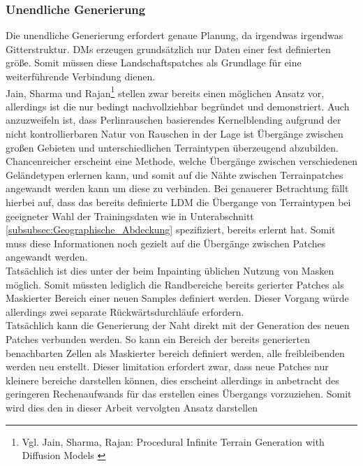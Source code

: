 \subsubsection {Unendliche Generierung}

Die unendliche Generierung erfordert genaue Planung, da irgendwas irgendwas Gitterstruktur. DMs erzeugen grundsätzlich nur Daten einer fest definierten größe. Somit müssen diese Landschaftspatches als Grundlage für eine weiterführende Verbindung dienen.\\
Jain, Sharma und Rajan\footnote{
    Vgl. Jain, Sharma, Rajan: Procedural Infinite Terrain Generation with Diffusion Models
    \cite{jain2022adaptive}
} stellen zwar bereits einen möglichen Ansatz vor, allerdings ist die nur bedingt nachvollziehbar begründet und demonstriert. Auch anzuzweifeln ist, dass Perlinrauschen basierendes Kernelblending aufgrund der nicht kontrollierbaren Natur von Rauschen in der Lage ist Übergänge zwischen großen Gebieten und unterschiedlichen Terraintypen überzeugend abzubilden. \\
Chancenreicher erscheint eine Methode, welche Übergänge zwischen verschiedenen Geländetypen erlernen kann, und somit auf die Nähte zwischen Terrainpatches angewandt werden kann um diese zu verbinden. Bei genauerer Betrachtung fällt hierbei auf, dass das bereits definierte LDM die Übergange von Terraintypen bei geeigneter Wahl der Trainingsdaten wie in Unterabschnitt \ref{subsubsec:Geographische_Abdeckung} spezifiziert, bereits erlernt hat. Somit muss diese Informationen noch gezielt auf die Übergänge zwischen Patches angewandt werden. \\
Tatsächlich ist dies unter der beim Inpainting üblichen Nutzung von Masken möglich. Somit müssten lediglich die Randbereiche bereits gerierter Patches als Maskierter Bereich einer neuen Samples definiert werden. Dieser Vorgang würde allerdings zwei separate Rückwärtsdurchläufe erfordern. \\
Tatsächlich kann die Generierung der Naht direkt mit der Generation des neuen Patches verbunden werden. So kann ein Bereich der bereits generierten benachbarten Zellen als Maskierter bereich definiert werden, alle freibleibenden werden neu erstellt. Dieser limitation erfordert zwar, dass neue Patches nur kleinere bereiche darstellen können, dies erscheint allerdings in anbetracht des geringeren Rechenaufwands für das erstellen eines Übergangs vorzuziehen. Somit wird dies den in dieser Arbeit vervolgten Ansatz darstellen

